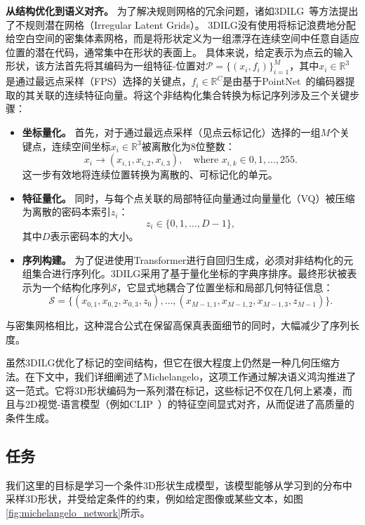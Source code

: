 \documentclass[../../book-main_zh.tex]{subfiles}
\begin{document}
\textbf{从结构优化到语义对齐。}
为了解决规则网格的冗余问题，诸如3DILG~\cite{zhang20223dilg}等方法提出了不规则潜在网格（Irregular Latent Grids）。
3DILG没有使用将标记浪费地分配给空白空间的密集体素网格，而是将形状定义为一组漂浮在连续空间中任意自适应位置的潜在代码，通常集中在形状的表面上。
具体来说，给定表示为点云的输入形状，该方法首先将其编码为一组特征-位置对$\mathcal{P} = \{(x_i, f_i)\}_{i=1}^M$，其中$x_i \in \mathbb{R}^3$是通过最远点采样（FPS）选择的关键点，$f_i \in \mathbb{R}^C$是由基于PointNet~\cite{qi2017pointnet}的编码器提取的其关联的连续特征向量。将这个非结构化集合转换为标记序列涉及三个关键步骤：
\begin{itemize}\item \textbf{坐标量化。} 首先，对于通过最远点采样（见点云标记化）选择的一组$M$个关键点，连续空间坐标$x_i \in \mathbb{R}^3$被离散化为8位整数：
\begin{equation}
x_i \rightarrow (x_{i,1}, x_{i,2}, x_{i,3}), \quad \text{where } x_{i,k} \in {0, 1, \dots, 255}.
\end{equation}
这一步有效地将连续位置转换为离散的、可标记化的单元。

\item \textbf{特征量化。} 同时，与每个点关联的局部特征向量通过向量量化（VQ）被压缩为离散的密码本索引$z_i$：
\begin{equation}
    z_i \in \{0, 1, \dots, D-1\},
\end{equation}
其中$D$表示密码本的大小。

\item \textbf{序列构建。} 为了促进使用Transformer进行自回归生成，必须对非结构化的元组集合进行序列化。3DILG采用了基于量化坐标的字典序排序。最终形状被表示为一个结构化序列$\mathcal{S}$，它显式地耦合了位置坐标和局部几何特征信息：
\begin{equation}
    \mathcal{S} = \big\{ (x_{0,1}, x_{0,2}, x_{0,3}, z_0), \dots, (x_{M-1,1}, x_{M-1,2}, x_{M-1,3}, z_{M-1}) \big\}.
\end{equation}
\end{itemize}
与密集网格相比，这种混合公式在保留高保真表面细节的同时，大幅减少了序列长度。

虽然3DILG优化了标记的空间结构，但它在很大程度上仍然是一种几何压缩方法。在下文中，我们详细阐述了Michelangelo，这项工作通过解决语义鸿沟推进了这一范式。它将3D形状编码为一系列潜在标记，这些标记不仅在几何上紧凑，而且与2D视觉-语言模型（例如CLIP~\cite{pmlr-v139-radford21a}）的特征空间显式对齐，从而促进了高质量的条件生成。

\subsection{任务}
我们这里的目标是学习一个条件3D形状生成模型，该模型能够从学习到的分布中采样3D形状，并受给定条件的约束，例如给定图像或某些文本，如图\ref{fig:michelangelo_network}所示。
\end{document}
